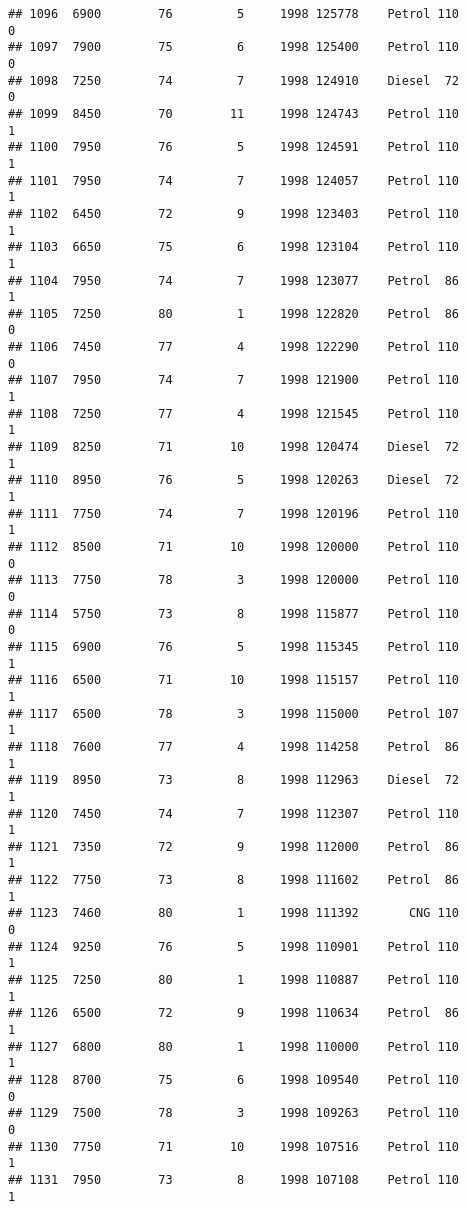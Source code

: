 \documentclass[]{article}
\begin{document}
\begin{verbatim}
## 1096  6900        76         5     1998 125778    Petrol 110         0
## 1097  7900        75         6     1998 125400    Petrol 110         0
## 1098  7250        74         7     1998 124910    Diesel  72         0
## 1099  8450        70        11     1998 124743    Petrol 110         1
## 1100  7950        76         5     1998 124591    Petrol 110         1
## 1101  7950        74         7     1998 124057    Petrol 110         1
## 1102  6450        72         9     1998 123403    Petrol 110         1
## 1103  6650        75         6     1998 123104    Petrol 110         1
## 1104  7950        74         7     1998 123077    Petrol  86         1
## 1105  7250        80         1     1998 122820    Petrol  86         0
## 1106  7450        77         4     1998 122290    Petrol 110         0
## 1107  7950        74         7     1998 121900    Petrol 110         1
## 1108  7250        77         4     1998 121545    Petrol 110         1
## 1109  8250        71        10     1998 120474    Diesel  72         1
## 1110  8950        76         5     1998 120263    Diesel  72         1
## 1111  7750        74         7     1998 120196    Petrol 110         1
## 1112  8500        71        10     1998 120000    Petrol 110         0
## 1113  7750        78         3     1998 120000    Petrol 110         0
## 1114  5750        73         8     1998 115877    Petrol 110         0
## 1115  6900        76         5     1998 115345    Petrol 110         1
## 1116  6500        71        10     1998 115157    Petrol 110         1
## 1117  6500        78         3     1998 115000    Petrol 107         1
## 1118  7600        77         4     1998 114258    Petrol  86         1
## 1119  8950        73         8     1998 112963    Diesel  72         1
## 1120  7450        74         7     1998 112307    Petrol 110         1
## 1121  7350        72         9     1998 112000    Petrol  86         1
## 1122  7750        73         8     1998 111602    Petrol  86         1
## 1123  7460        80         1     1998 111392       CNG 110         0
## 1124  9250        76         5     1998 110901    Petrol 110         1
## 1125  7250        80         1     1998 110887    Petrol 110         1
## 1126  6500        72         9     1998 110634    Petrol  86         1
## 1127  6800        80         1     1998 110000    Petrol 110         1
## 1128  8700        75         6     1998 109540    Petrol 110         0
## 1129  7500        78         3     1998 109263    Petrol 110         0
## 1130  7750        71        10     1998 107516    Petrol 110         1
## 1131  7950        73         8     1998 107108    Petrol 110         1

\end{verbatim}
\end{document}
